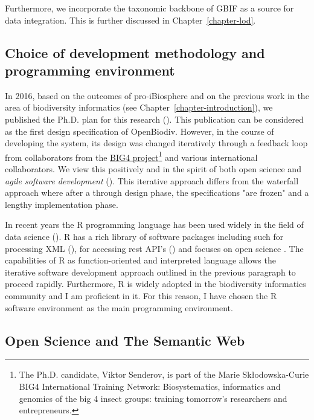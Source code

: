 Furthermore, we incorporate the taxonomic backbone of GBIF \cite{gbif_secretariat_gbif_2017} as a source for data integration. This is further discussed in Chapter~\ref{chapter-lod}.

\subsection*{Choice of development methodology and programming environment}

In 2016, based on the outcomes of pro-iBiosphere and on the previous work in the area of biodiversity informatics (see Chapter~\ref{chapter-introduction}), we published the Ph.D. plan for this research (\cite{senderov_open_2016}). This publication can be considered as the first design specification of OpenBiodiv. However, in the course of developing the system, its design was changed iteratively through a feedback loop from collaborators from the \href{http://big4-project.eu}{BIG4 project}\footnote{The Ph.D. candidate, Viktor Senderov, is part of the Marie Skłodowska-Curie BIG4 International Training Network: Biosystematics, informatics and genomics of the big 4 insect groups: training tomorrow's researchers and entrepreneurs.} and various international collaborators. We view this positively and in the spirit of both open science and \emph{agile software development} (\cite{beck_manifesto_2001}). This iterative approach differs from the waterfall approach where after a through design phase, the specifications "are frozen" and a lengthy implementation phase.

In recent years the R programming language has been used widely in the field of data science (\cite{r_core_team_r:_2016}). R has a rich library of software packages including such for processing XML (\cite{wickham_xml2:_2018}), for accessing rest API's (\cite{wickham_httr:_2017}) and focuses on open science \cite{boettiger_building_2015}. The capabilities of R as function-oriented and interpreted language allows the iterative software development approach outlined in the previous paragraph to proceed rapidly. Furthermore, R is widely adopted in the biodiversity informatics community and I am proficient in it. For this reason, I have chosen the R software environment as the main programming environment.

\subsection*{Open Science and The Semantic Web}

